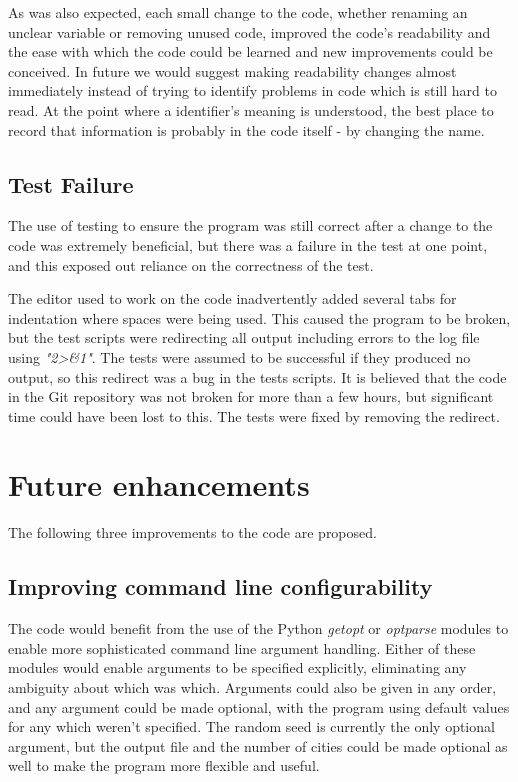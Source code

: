 \documentclass[11pt, oneside]{article}   %
\begin{document}
As was also expected, each small change to the code, whether renaming an unclear variable or removing unused code, improved the code’s readability and the ease with which the code could be learned and new improvements could be conceived.
In future we would suggest making readability changes almost immediately instead of trying to identify problems in code which is still hard to read.
At the point where a identifier’s meaning is understood, the best place to record that information is probably in the code itself - by changing the name.

\subsection{Test Failure}
\label{subsec:TestFail}

The use of testing to ensure the program was still correct after a change to the code was extremely beneficial, but there was a failure in the test at one point, and this exposed out reliance on the correctness of the test.

The editor used to work on the code inadvertently added several tabs for indentation where spaces were being used.
This caused the program to be broken, but the test scripts were redirecting all output including errors to the log file using {\em "2\textgreater\&1"}.
The tests were assumed to be successful if they produced no output, so this redirect was a bug in the tests scripts.
It is believed that the code in the Git repository was not broken for more than a few hours, but significant time could have been lost to this.
The tests were fixed by removing the redirect.

\section{Future enhancements}
The following three improvements to the code are proposed.

\subsection{Improving command line configurability}
The code would benefit from the use of the Python {\em getopt} or {\em optparse} modules to enable more sophisticated command line argument handling.
Either of these modules would enable arguments to be specified explicitly, eliminating any ambiguity about which was which.
Arguments could also be given in any order, and any argument could be made optional, with the program using default values for any which weren't specified.
The random seed is currently the only optional argument, but the output file and the number of cities could be made optional as well to make the program more flexible and useful.
\end{document}

